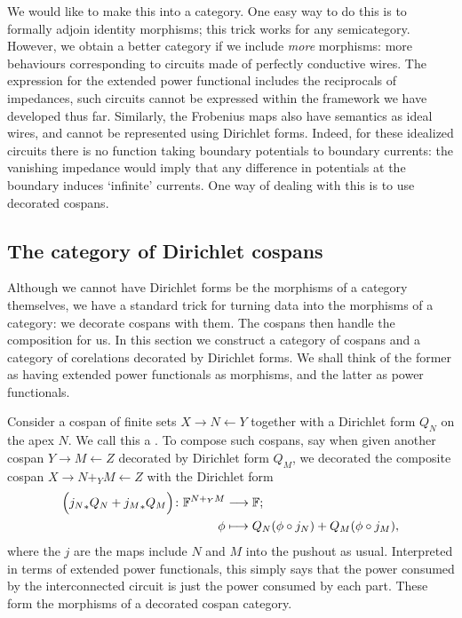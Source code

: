We would like to make this into a category. One easy way to do this is to
formally adjoin identity morphisms; this trick works for any semicategory.
However, we obtain a better category if we include \emph{more} morphisms: more
behaviours corresponding to circuits made of perfectly conductive wires.
The expression for the extended power functional includes the reciprocals of
impedances, such circuits cannot be expressed within the framework we have
developed thus far. Similarly, the Frobenius maps also have semantics as ideal
wires, and cannot be represented using Dirichlet forms.  Indeed, for these
idealized circuits there is no function taking boundary potentials to boundary
currents: the vanishing impedance would imply that any difference in potentials
at the boundary induces `infinite' currents. One way of dealing with this is to
use decorated cospans.


\subsection{The category of Dirichlet cospans} \label{ssec.dirichcospans}

Although we cannot have Dirichlet forms be the morphisms of a category
themselves, we have a standard trick for turning data into the morphisms of a
category: we decorate cospans with them. The cospans then handle the composition
for us. In this section we construct a category of cospans and a category of
corelations decorated by Dirichlet forms. We shall think of the former as having
extended power functionals as morphisms, and the latter as power functionals.

Consider a cospan of finite sets $X \to N \leftarrow Y$ together with a
Dirichlet form $Q_N$ on the apex $N$. We call this a .
To compose such cospans, say when given another cospan $Y \to M \leftarrow Z$
decorated by Dirichlet form $Q_M$, we decorated the composite cospan $X \to
N+_YM \leftarrow Z$ with the Dirichlet form
\begin{align*}
  \Big({j_N}_\ast Q_N+ {j_M}_\ast Q_M\Big){\colon} {\mathbb F}^{N+_YM} &\longrightarrow {\mathbb F};\\
  \phi &\longmapsto Q_N(\phi\circ j_N)+Q_M(\phi\circ j_M),
\end{align*}
where the $j$ are the maps include $N$ and $M$ into the pushout as usual.
Interpreted in terms of extended power functionals, this simply says that the
power consumed by the interconnected circuit is just the power consumed by each
part. These form the morphisms of a decorated cospan category.

